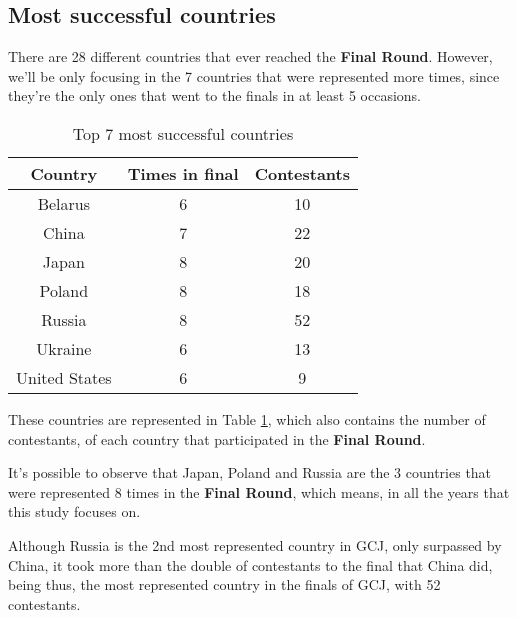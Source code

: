 \documentclass{article}
\begin{document}
\begin{multicols*}{2}
\subsection{Most successful countries}

There are 28 different countries that ever reached the \textbf{Final Round}. However, we'll be only focusing in the 7 countries that were represented more times, since they're the only ones that went to the finals in at least 5 occasions.

\begin{table}[H]
\centering
\caption{Top 7 most successful countries}
\label{top7_suc}
\begin{tabular}{c|c|c}
\textbf{Country} & \textbf{Times in final} & \textbf{Contestants} \\ \hline
Belarus          & 6                       & 10                            \\
China            & 7                       & 22                            \\
Japan            & 8                       & 20                            \\
Poland           & 8                       & 18                            \\
Russia           & 8                       & 52                            \\
Ukraine          & 6                       & 13                            \\
United States    & 6                       & 9
\end{tabular}
\end{table}

These countries are represented in Table \ref{top7_suc}, which also contains the number of contestants, of each country that participated in the \textbf{Final Round}.

It's possible to observe that Japan, Poland and Russia are the 3 countries that were represented 8 times in the \textbf{Final Round}, which means, in all the years that this study focuses on.


Although Russia is the 2nd most represented country in GCJ, only surpassed by China, it took more than the double of contestants to the final that China did, being thus, the most represented country in the finals of GCJ, with 52 contestants.


\end{multicols*}
\end{document}
